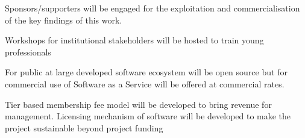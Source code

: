 \item Sponsors/supporters will be engaged for the exploitation and commercialisation of the key findings of this work.
\item Workshops for institutional stakeholders will be hosted to train young professionals
\item For public at large developed software ecosystem will be open source but for commercial use of Software as a Service will be offered at commercial rates.
\item Tier based membership fee model will be developed to bring revenue for management. Licensing mechanism of software will be developed to make the project sustainable beyond project funding
